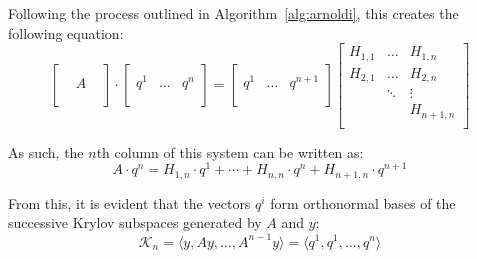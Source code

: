 Following the process outlined in Algorithm~\hyperref[alg:arnoldi]{\ref{alg:arnoldi}}, this creates the following equation:
\begin{equation}
  \left[
    \begin{array}{ccc}
      &  & \\
      & A & \\
      &  & \\
    \end{array}
  \right] \cdot
  \left[
    \begin{array}{c|c|c}
      & & \\
      q^1 &\dots & q^n \\
      & & \\
    \end{array}
  \right] = 
  \left[
    \begin{array}{c|c|c}
      & & \\
      q^1 &\dots & q^{n+1} \\
      & & \\
    \end{array}
  \right]
  \left[
    \begin{array}{ccc}
      H_{1,1} & \dots & H_{1,n} \\
      H_{2,1} & \dots &  H_{2,n}\\
      & \ddots & \vdots \\
      & & H_{n+1, n}  \\
    \end{array}
  \right] 
\end{equation}

\noindent As such, the $n$th column of this system can be written as:
\begin{equation}
    A \cdot q^n = H_{1,n}\cdot q^1+ \cdots + H_{n,n}\cdot q^n + H_{n+1,n}\cdot q^{n+1}
\end{equation}

From this, it is evident that the vectors $q^i$ form orthonormal bases of the successive Krylov subspaces generated by $A$ and $y$:
\begin{equation}
    \mathcal{K}_n=\langle y, Ay, \dots , A^{n-1}y\rangle = \langle q^1,q^1, \dots , q^{n}\rangle
\end{equation}